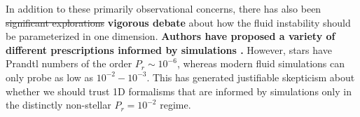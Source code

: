 In addition to these primarily observational concerns, there has also been \sout{significant explorations} \textbf{vigorous debate} about how the fluid instability should be parameterized in one dimension. \textbf{Authors have proposed a variety of different prescriptions informed by simulations \citep[e.g.~][]{traxler_etal_2011,brown_etal_2013}.} However, 
%
%
%
stars have Prandtl numbers of the order $P_r \sim 10^{-6}$, whereas modern fluid simulations can only probe as low as $10^{-2} - 10^{-3}$. This has generated justifiable skepticism about whether we should trust 1D formalisms that are informed by simulations only in the distinctly non-stellar $P_r = 10^{-2}$ regime. 
